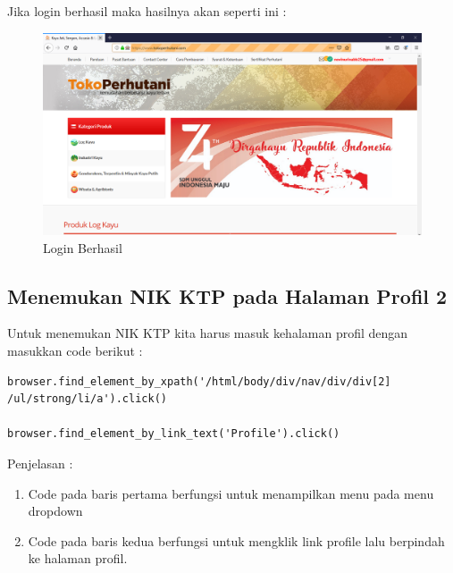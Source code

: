 Jika login berhasil maka hasilnya akan seperti ini :
\begin{figure}[h]
	\centering
	\includegraphics[scale=0.28]{figures/loginn}
	\caption{Login Berhasil}
\end{figure}

\newpage
\subsection{Menemukan NIK KTP pada Halaman Profil 2}
Untuk menemukan NIK KTP kita harus masuk kehalaman profil dengan masukkan code berikut :
\begin{verbatim}
browser.find_element_by_xpath('/html/body/div/nav/div/div[2]
/ul/strong/li/a').click()

browser.find_element_by_link_text('Profile').click()
\end{verbatim}

Penjelasan :
\begin{enumerate}
	\item Code pada baris pertama berfungsi untuk menampilkan menu pada menu dropdown 
	\item Code pada baris kedua berfungsi untuk mengklik link profile lalu berpindah ke halaman profil.
\end{enumerate}

